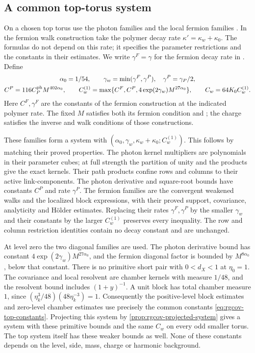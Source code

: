 \subsection{A common top-torus system}
\label{subsec:rgcov-top-system}

On a chosen top torus use the photon families
 and the local
fermion families .
In the fermion walk construction take the polymer
decay rate $\kappa'=\kappa_w+\kappa_0$.
The formulas do not depend on this rate; it specifies
the parameter restrictions and the constants in their
estimates. We write $\gamma^F=\gamma$ for the fermion
decay rate in . Define
\begin{gather}
 \alpha_0=1/54,\qquad
 \gamma_w=\min(\gamma^F,\gamma^P),\quad
                                \gamma^P=\gamma_P/2, \notag\\
 C^P=116C_P^{\mathrm{ph}}M^{402\alpha_0},\qquad
 C_w^{(1)}=\max\{C^F,C^P,4\exp(2\gamma_w)M^{27\alpha_0}\},
 \qquad C_w=64K_0C_w^{(1)}.             \label{eq:rgcov-top-constants}
\end{gather}
Here $C^F,\gamma^F$ are the constants of the fermion
construction at the indicated polymer rate.
The fixed $M$ satisfies both its fermion condition and
; the charge satisfies
the inverse and walk conditions of those constructions.

These families form a system with
$(\alpha_0,\gamma_w,\kappa_w+\kappa_0;C_w^{(1)})$.
This follows by matching their proved properties.
The photon kernel multipliers are polynomials in their
parameter cubes; at full strength the partition of unity
and the products give the exact kernels. Their path
products confine rows and columns to their active
link-components. The photon derivative and square-root
bounds have constants $C^P$ and rate $\gamma^P$.
The fermion families are the convergent weakened walks
and the localized block expressions, with their proved
support, covariance, analyticity and H\"older estimates.
Replacing their rates $\gamma^F,\gamma^P$ by the smaller
$\gamma_w$ and their constants by the larger $C_w^{(1)}$
preserves every inequality. The row and column
restriction identities contain no decay constant and
are unchanged.

At level zero the two diagonal families are used.
The photon derivative bound has constant
$4\exp(2\gamma_w)M^{27\alpha_0}$, and the fermion
diagonal factor is bounded by
$M^{8\alpha_0}$, below that constant.
There is no primitive short pair with $0<d_X<1$ at $\eta_0=1$.
The covariance and local resolvent are chamber kernels
with measure $1/48$, and the resolvent bound includes
$(1+y)^{-1}$. A unit block has total chamber measure
$1$, since
$(\eta_k^3/48)(48\eta_k^{-3})=1$.
Consequently the positive-level block estimates and
zero-level chamber estimates use precisely the common
constants \eqref{eq:rgcov-top-constants}.
Projecting this system by \cref{prop:rgcov-projected-system}
gives a system with these primitive bounds and the same $C_w$ on every
odd smaller torus. The top system itself has these
weaker bounds as well. None of these constants depends
on the level, side, mass, charge or harmonic background.

